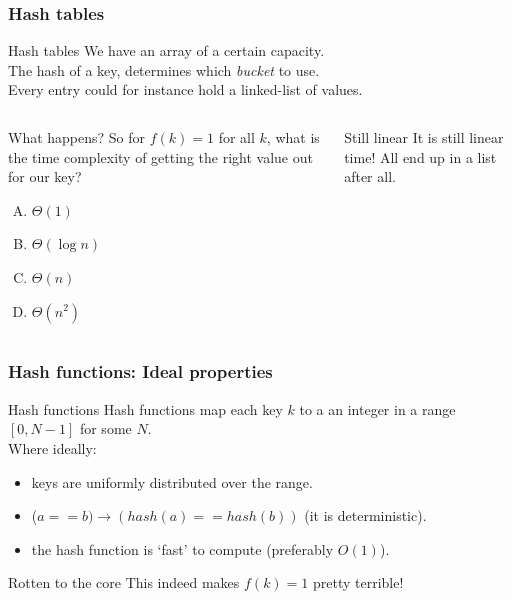 \begin{frame}
	\frametitle{Hash tables}
	\begin{block}{Hash tables}
		We have an array of a certain capacity.\\
		The hash of a key, determines which \textit{bucket} to use.\\
		\pause
		Every entry could for instance hold a linked-list of values.
	\end{block}		
	\pause
	\begin{columns}
			
	\begin{block}{What happens?}
		So for $f(k) = 1$ for all $k$, what is the time complexity of getting the right value out for our key?
		\begin{enumerate}[A.]
			\item $\Theta(1)$
			\item $\Theta(\log n)$
			\item $\Theta(n)$
			\item $\Theta(n^2)$
		\end{enumerate}
	\end{block}
			
		\pause
		\begin{block}{Still linear}
			It is still linear time! All end up in a list after all.
		\end{block}
	\end{columns}
\end{frame}

\begin{frame}
	\frametitle{Hash functions: Ideal properties}
	
		\begin{block}{Hash functions}
			Hash functions map each key $k$ to a an integer in a range $[0, N-1]$ for some $N$.\\
			Where ideally:
			\pause
			\begin{itemize}
				\item keys are uniformly distributed over the range.
					\pause
				\item ($a == b) \to (\mathit{hash}(a) == \mathit{hash}(b))$ (it is deterministic).
					\pause
				\item the hash function is `fast' to compute (preferably $O(1)$).
			\end{itemize}

		\end{block}	
			\begin{block}{Rotten to the core}
				This indeed makes $f(k) = 1$ pretty terrible!
			\end{block}	
\end{frame}

